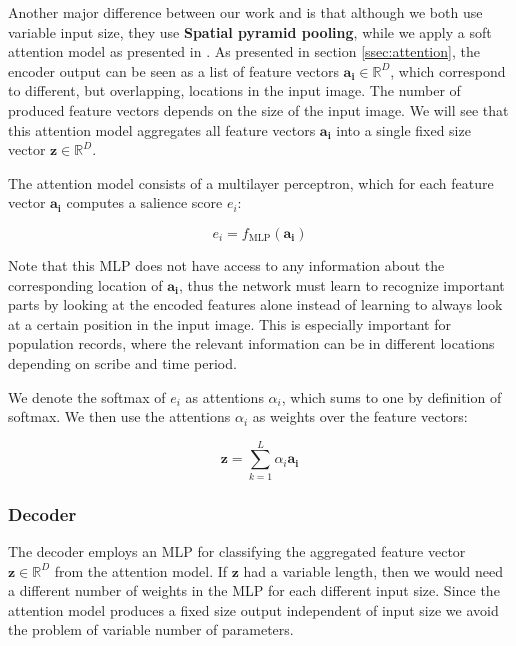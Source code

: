 Another major difference between our work and \cite{FornesCnnCategorization} is that although we both use variable input size, they use \textbf{Spatial pyramid pooling}, while we apply a soft attention model as presented in \cite{AttendAndTell}. As presented in section \ref{ssec:attention}, the encoder output can be seen as a list of feature vectors $\mathbf{a_i} \in \mathbb{R}^D$, which correspond to different, but overlapping, locations in the input image. The number of produced feature vectors depends on the size of the input image. We will see that this attention model aggregates all feature vectors $\mathbf{a_i}$ into a single fixed size vector $\mathbf{z} \in \mathbb{R}^D$.

The attention model consists of a multilayer perceptron, which for each feature vector $\mathbf{a_i}$ computes a salience score $e_i$:

\[
e_i = f_\text{MLP}(\mathbf{a_i})
\]

Note that this MLP does not have access to any information about the corresponding location of $\mathbf{a_i}$, thus the network must learn to recognize important parts by looking at the encoded features alone instead of learning to always look at a certain position in the input image. This is especially important for population records, where the relevant information can be in different locations depending on scribe and time period.


We denote the softmax of $e_i$ as attentions $\alpha_i$, which sums to one by definition of softmax.
We then use the attentions $\alpha_i$ as weights over the feature vectors:

\[
\mathbf{z} = \sum_{k=1}^L \alpha_i \mathbf{a_i}
\]



\subsubsection{Decoder}

The decoder employs an MLP for classifying the aggregated feature vector $\mathbf{z} \in \mathbb{R}^D$ from the attention model.
If $\mathbf{z}$ had a variable length, then we would need a different number of weights in the MLP for each different input size. Since the attention model produces a fixed size output independent of input size we avoid the problem of variable number of parameters.

